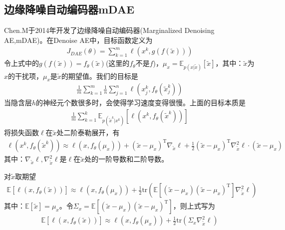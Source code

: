     \subsection{边缘降噪自动编码器mDAE}
        \par
        Chen.M于2014年开发了边缘降噪自动编码器(Marginalized Denoising AE,mDAE)\cite{2014.Chen}。在Denoise AE中，目标函数定义为
        \begin{align*}
        J_{DAE}(\theta) = \sum_{k=1}^m \ell \left( x^k,g(f(\tilde{x})) \right)
        \end{align*}
        令上式中的$g(f(\tilde{x})) = f_\theta(\tilde{x})$(这里的$f_\theta$不是$f$)，$\mu_x = \mathbb{E}_{p(x|\tilde{x})}[\tilde{x}]$，其中：$\tilde{x}$为$x$的干扰项，$\mu_x$是$\tilde{x}$的期望值。我们的目标是
        \begin{align*}
        \frac{1}{m} \sum_{k=1}^m \frac{1}{n} \sum_{j=1}^n \ell \left( x_j^k,f_\theta \left( \tilde{x}_j^k \right)  \right)
        \end{align*}
        当隐含层$h$的神经元个数很多时，会使得学习速度变得很慢。上面的目标本质是
        \begin{align*}
        \frac{1}{m} \sum_{k=1}^k \mathbb{E}_{p(\tilde{x}^k|x^k)}[\ell (x^k,f_\theta(\tilde{x}^k))  ]
        \end{align*}
        将损失函数$\ell$在$\tilde{x}$处二阶泰勒展开，有
        \begin{align*}
        \ell \left( x^k,f_\theta(\tilde{x}^k) \right) \approx \ell (x,f_\theta(\mu_x))+(\tilde{x} - \mu_x)^\mathrm{T}\nabla_{\tilde{x}} \ell+ \frac{1}{2}(\tilde{x} - \mu_x)^\mathrm{T}\nabla_{\tilde{x}}^2 \ell \cdot (\tilde{x} - \mu_x)
        \end{align*}
        其中：$\nabla_{\tilde{x}}\ell,\nabla_{\tilde{x}}^2\ell$是$\ell$在$\tilde{x}$处的一阶导数和二阶导数。
        \par
        对$\tilde{x}$取期望
        \begin{align*}
        \mathbb{E} [\ell(x,f_\theta(\tilde{x}))] \approx \ell (x,f_\theta(\mu_x)) + \frac{1}{2} \mathrm{tr} \left( \mathbb{E}[(\tilde{x} - \mu_x)(\tilde{x} - \mu_x)^\mathrm{T} ]\nabla_{\tilde{x}}^2 \ell\right)
        \end{align*}
        其中：$\mathbb{E}[\tilde{x}] = \mu_x$。令$\Sigma_x = \mathbb{E}[(\tilde{x} - \mu_x)(\tilde{x} - \mu_x)^\mathrm{T} ]$，则上式写为
        \begin{align*}
        \mathbb{E} [\ell(x,f_\theta(\tilde{x}))] \approx \ell (x,f_\theta(\mu_x)) + \frac{1}{2} \mathrm{tr} \left(\Sigma_x \nabla_{\tilde{x}}^2 \ell \right)
        \end{align*}
